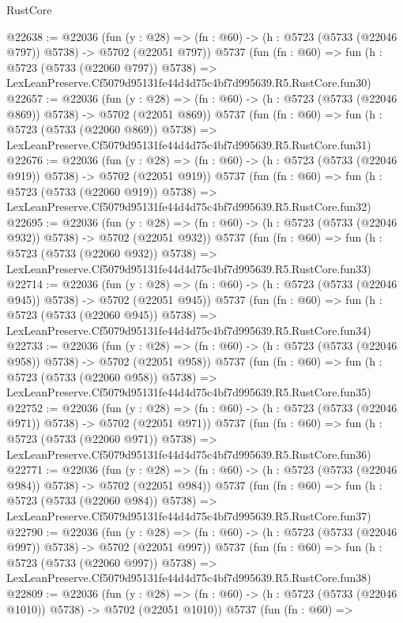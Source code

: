 \begin{lexlean}{RustCore}
\begin{coremodule}
@22638 := @22036
    (fun (y : @28) => (fn : @60) -> (h : @5723 (@5733 (@22046 @797)) @5738) -> @5702 (@22051 @797))
    @5737
    (fun (fn : @60) =>
    fun (h : @5723 (@5733 (@22060 @797)) @5738) =>
    LexLeanPreserve.Cf5079d95131fe44d4d75c4bf7d995639.R5.RustCore.fun30)
@22657 := @22036
    (fun (y : @28) => (fn : @60) -> (h : @5723 (@5733 (@22046 @869)) @5738) -> @5702 (@22051 @869))
    @5737
    (fun (fn : @60) =>
    fun (h : @5723 (@5733 (@22060 @869)) @5738) =>
    LexLeanPreserve.Cf5079d95131fe44d4d75c4bf7d995639.R5.RustCore.fun31)
@22676 := @22036
    (fun (y : @28) => (fn : @60) -> (h : @5723 (@5733 (@22046 @919)) @5738) -> @5702 (@22051 @919))
    @5737
    (fun (fn : @60) =>
    fun (h : @5723 (@5733 (@22060 @919)) @5738) =>
    LexLeanPreserve.Cf5079d95131fe44d4d75c4bf7d995639.R5.RustCore.fun32)
@22695 := @22036
    (fun (y : @28) => (fn : @60) -> (h : @5723 (@5733 (@22046 @932)) @5738) -> @5702 (@22051 @932))
    @5737
    (fun (fn : @60) =>
    fun (h : @5723 (@5733 (@22060 @932)) @5738) =>
    LexLeanPreserve.Cf5079d95131fe44d4d75c4bf7d995639.R5.RustCore.fun33)
@22714 := @22036
    (fun (y : @28) => (fn : @60) -> (h : @5723 (@5733 (@22046 @945)) @5738) -> @5702 (@22051 @945))
    @5737
    (fun (fn : @60) =>
    fun (h : @5723 (@5733 (@22060 @945)) @5738) =>
    LexLeanPreserve.Cf5079d95131fe44d4d75c4bf7d995639.R5.RustCore.fun34)
@22733 := @22036
    (fun (y : @28) => (fn : @60) -> (h : @5723 (@5733 (@22046 @958)) @5738) -> @5702 (@22051 @958))
    @5737
    (fun (fn : @60) =>
    fun (h : @5723 (@5733 (@22060 @958)) @5738) =>
    LexLeanPreserve.Cf5079d95131fe44d4d75c4bf7d995639.R5.RustCore.fun35)
@22752 := @22036
    (fun (y : @28) => (fn : @60) -> (h : @5723 (@5733 (@22046 @971)) @5738) -> @5702 (@22051 @971))
    @5737
    (fun (fn : @60) =>
    fun (h : @5723 (@5733 (@22060 @971)) @5738) =>
    LexLeanPreserve.Cf5079d95131fe44d4d75c4bf7d995639.R5.RustCore.fun36)
@22771 := @22036
    (fun (y : @28) => (fn : @60) -> (h : @5723 (@5733 (@22046 @984)) @5738) -> @5702 (@22051 @984))
    @5737
    (fun (fn : @60) =>
    fun (h : @5723 (@5733 (@22060 @984)) @5738) =>
    LexLeanPreserve.Cf5079d95131fe44d4d75c4bf7d995639.R5.RustCore.fun37)
@22790 := @22036
    (fun (y : @28) => (fn : @60) -> (h : @5723 (@5733 (@22046 @997)) @5738) -> @5702 (@22051 @997))
    @5737
    (fun (fn : @60) =>
    fun (h : @5723 (@5733 (@22060 @997)) @5738) =>
    LexLeanPreserve.Cf5079d95131fe44d4d75c4bf7d995639.R5.RustCore.fun38)
@22809 := @22036
    (fun (y : @28) =>
    (fn : @60) -> (h : @5723 (@5733 (@22046 @1010)) @5738) -> @5702 (@22051 @1010))
    @5737
    (fun (fn : @60) =>

\end{coremodule}
\end{lexlean}
